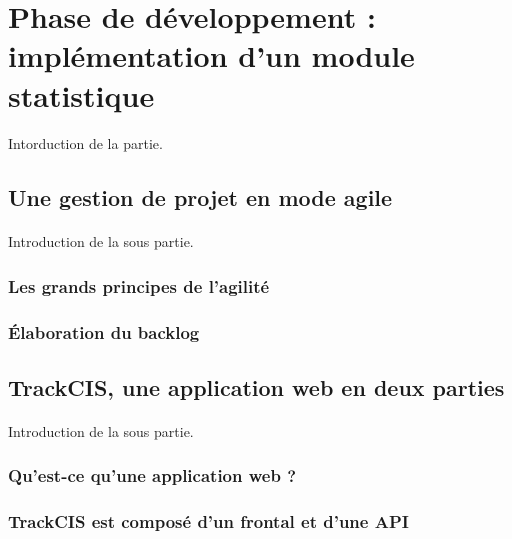 \section{Phase de développement : implémentation d'un module statistique}
	\paragraph{}
	Intorduction de la partie.
	
	\subsection{Une gestion de projet en mode agile}
		\paragraph{}
		Introduction de la sous partie.
		
		\subsubsection{Les grands principes de l'agilité}
		\subsubsection{Élaboration du backlog}
	
	\subsection{TrackCIS, une application web en deux parties}
		\paragraph{}
		Introduction de la sous partie.
		
		\subsubsection{Qu'est-ce qu'une application web ?}
			\paragraph{}%
			
			\paragraph{}%
		\subsubsection{TrackCIS est composé d'un frontal et d'une API}

